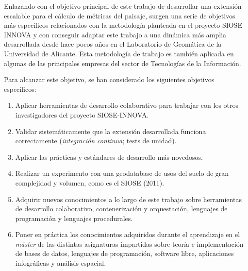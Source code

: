 Enlazando con el objetivo principal de este trabajo de desarrollar una extensión escalable para el cálculo de métricas del paisaje, surgen una serie de objetivos más específicos relacionados con la metodología planteada en el proyecto SIOSE-INNOVA y con conseguir adaptar este trabajo a una dinámica más amplia desarrollada desde hace pocos años en el Laboratorio de Geomática de la Universidad de Alicante. Esta metodología de trabajo es también aplicada en algunas de las principales empresas del sector de Tecnologías de la Información.

Para alcanzar este objetivo, se han considerado los siguientes objetivos específicos:
\begin{enumerate}
\item Aplicar herramientas de desarrollo colaborativo para trabajar con los otros investigadores del proyecto SIOSE-INNOVA.
\item Validar sistemáticamente que la extensión desarrollada funciona correctamente (\textit{integración continua}; tests de unidad).
\item Aplicar las prácticas y estándares de desarrollo más novedosos.
\item Realizar un experimento con una geodatabase de usos del suelo de gran complejidad y volumen, como es el SIOSE (2011).
\item Adquirir nuevos conocimientos a lo largo de este trabajo sobre herramientas de desarrollo colaborativo, contenerización y orquestación, lenguajes de programación y lenguajes procedurales.
\item Poner en práctica los conocimientos adquiridos durante el aprendizaje en el \textit{máster} de las distintas asignaturas impartidas sobre teoría e implementación de bases de datos, lenguajes de programación, software libre, aplicaciones infográficas y análisis espacial.
\end{enumerate}






